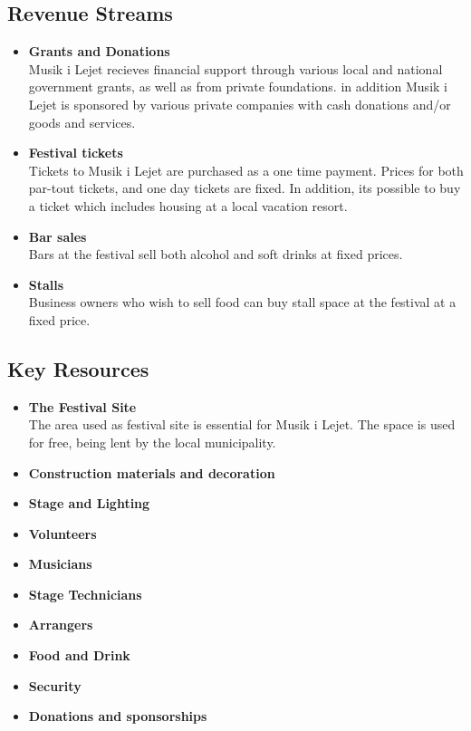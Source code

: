 \subsection{Revenue Streams} %
\label{sub:revenue_streams}
\begin{itemize}
	\item \textbf{Grants and Donations}\\
	Musik i Lejet recieves financial support through various local and national government grants, as well as from private foundations. in addition Musik i Lejet is sponsored by various private companies with cash donations and/or goods and services.
	\item \textbf{Festival tickets}\\
	Tickets to Musik i Lejet are purchased as a one time payment. Prices for both par-tout tickets, and one day tickets are fixed. In addition, its possible to buy a ticket which includes housing at a local vacation resort.
	\item \textbf{Bar sales}\\
	Bars at the festival sell both alcohol and soft drinks at fixed prices.
	\item \textbf{Stalls}\\
	Business owners who wish to sell food can buy stall space at the festival at a fixed price.
\end{itemize}

\subsection{Key Resources} %
\label{sub:key_resources}
\begin{itemize}
	\item \textbf{The Festival Site}\\
	The area used as festival site is essential for Musik i Lejet. The space is used for free, being lent by the local municipality.
	\item \textbf{Construction materials and decoration}\\
	\item \textbf{Stage and Lighting}\\
	\item \textbf{Volunteers}\\
	\item \textbf{Musicians}\\
	\item \textbf{Stage Technicians}\\
	\item \textbf{Arrangers}\\
	\item \textbf{Food and Drink}\\
	\item \textbf{Security}\\
	\item \textbf{Donations and sponsorships}\\
\end{itemize}

